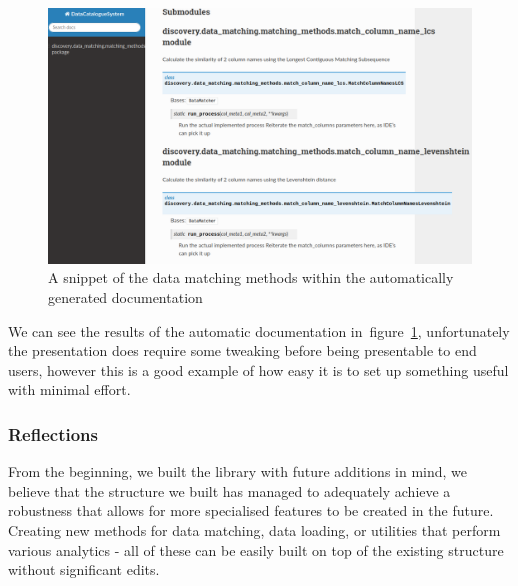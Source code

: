 \begin{figure}[H]
    \centering
    \includegraphics[width=12cm]{figures/discovery_library/discovery_client_documentation}
    \caption{A snippet of the data matching methods within the automatically generated documentation}
    \label{fig:discovery_client_documentation}
\end{figure}

We can see the results of the automatic documentation in~figure~\ref{fig:discovery_client_documentation}, unfortunately
the presentation does require some tweaking before being presentable to end users, however this is a good example of how
easy it is to set up something useful with minimal effort.

\subsubsection{Reflections}
From the beginning, we built the library with future additions in mind, we believe that the structure we built has
managed to adequately achieve a robustness that allows for more specialised features to be created in the future.
Creating new methods for data matching, data loading, or utilities that perform various analytics - all of these can be
easily built on top of the existing structure without significant edits.
